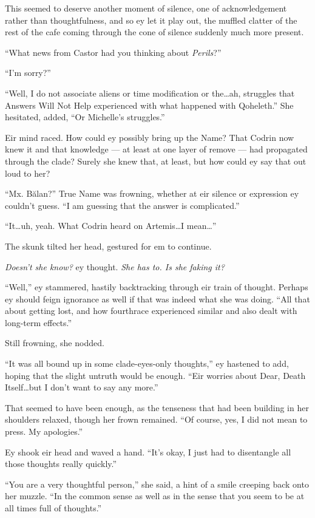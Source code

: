 This seemed to deserve another moment of silence, one of acknowledgement rather than thoughtfulness, and so ey let it play out, the muffled clatter of the rest of the cafe coming through the cone of silence suddenly much more present.

``What news from Castor had you thinking about \emph{Perils}?''

``I'm sorry?''

``Well, I do not associate aliens or time modification or the\ldots ah, struggles that Answers Will Not Help experienced with what happened with Qoheleth.'' She hesitated, added, ``Or Michelle's struggles.''

Eir mind raced. How could ey possibly bring up the Name? That Codrin now knew it and that knowledge — at least at one layer of remove — had propagated through the clade? Surely she knew that, at least, but how could ey say that out loud to her?

``Mx. Bălan?'' True Name was frowning, whether at eir silence or expression ey couldn't guess. ``I am guessing that the answer is complicated.''

``It\ldots uh, yeah. What Codrin heard on Artemis\ldots I mean\ldots{}''

The skunk tilted her head, gestured for em to continue.

\emph{Doesn't she know?} ey thought. \emph{She has to. Is she faking it?}

``Well,'' ey stammered, hastily backtracking through eir train of thought. Perhaps ey should feign ignorance as well if that was indeed what she was doing. ``All that about getting lost, and how fourthrace experienced similar and also dealt with long-term effects.''

Still frowning, she nodded.

``It was all bound up in some clade-eyes-only thoughts,'' ey hastened to add, hoping that the slight untruth would be enough. ``Eir worries about Dear, Death Itself\ldots but I don't want to say any more.''

That seemed to have been enough, as the tenseness that had been building in her shoulders relaxed, though her frown remained. ``Of course, yes, I did not mean to press. My apologies.''

Ey shook eir head and waved a hand. ``It's okay, I just had to disentangle all those thoughts really quickly.''

``You are a very thoughtful person,'' she said, a hint of a smile creeping back onto her muzzle. ``In the common sense as well as in the sense that you seem to be at all times full of thoughts.''

